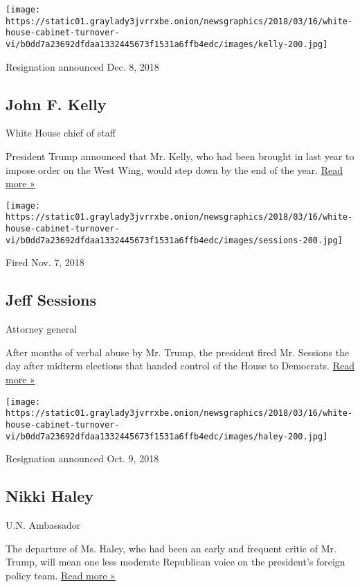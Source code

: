 \texttt{[image: https://static01.graylady3jvrrxbe.onion/newsgraphics/2018/03/16/white-house-cabinet-turnover-vi/b0dd7a23692dfdaa1332445673f1531a6ffb4edc/images/kelly-200.jpg]}

Resignation announced Dec. 8, 2018

\hypertarget{john-f-kelly}{%
\subsection{John F. Kelly}\label{john-f-kelly}}

White House chief of staff

President Trump announced that Mr. Kelly, who had been brought in last
year to impose order on the West Wing, would step down by the end of the
year.
\href{https://www.nytimes3xbfgragh.onion/2018/12/08/us/politics/john-kelly-chief-staff-trump.html}{Read
more »}

\texttt{[image: https://static01.graylady3jvrrxbe.onion/newsgraphics/2018/03/16/white-house-cabinet-turnover-vi/b0dd7a23692dfdaa1332445673f1531a6ffb4edc/images/sessions-200.jpg]}

Fired Nov. 7, 2018

\hypertarget{jeff-sessions}{%
\subsection{Jeff Sessions}\label{jeff-sessions}}

Attorney general

After months of verbal abuse by Mr. Trump, the president fired Mr.
Sessions the day after midterm elections that handed control of the
House to Democrats.
\href{https://www.nytimes3xbfgragh.onion/2018/11/07/us/politics/sessions-resigns.html?action=click\&module=Top\%20Stories\&pgtype=Homepage}{Read
more »}

\texttt{[image: https://static01.graylady3jvrrxbe.onion/newsgraphics/2018/03/16/white-house-cabinet-turnover-vi/b0dd7a23692dfdaa1332445673f1531a6ffb4edc/images/haley-200.jpg]}

Resignation announced Oct. 9, 2018

\hypertarget{nikki-haley}{%
\subsection{Nikki Haley}\label{nikki-haley}}

U.N. Ambassador

The departure of Ms. Haley, who had been an early and frequent critic of
Mr. Trump, will mean one less moderate Republican voice on the
president's foreign policy team.
\href{https://www.nytimes3xbfgragh.onion/2018/10/09/us/politics/nikki-haley-united-nations.html}{Read
more »}

